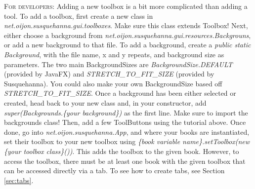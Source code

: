 \documentclass{report}
\begin{document}
	\par
	\begin{tcolorbox}[width=1\textwidth]
		\textsc{For developers:} Adding a new toolbox is a bit more complicated than adding a tool. To add a toolbox, first create a new class in \emph{net.oijon.susquehanna.gui.toolboxes}. Make sure this class extends Toolbox! Next, either choose a background from \emph{net.oijon.susquehanna.gui.resources.Backgrouns}, or add a new background to that file. To add a background, create a \emph{public static Background}, with the file name, x and y repeats, and background size as parameters. The two main BackgroundSizes are \emph{BackgroundSize.DEFAULT} (provided by JavaFX) and \emph{STRETCH\_TO\_FIT\_SIZE} (provided by Susquehanna). You could also make your own BackgroundSize based off \emph{STRETCH\_TO\_FIT\_SIZE}. Once a background has been either selected or created, head back to your new class and, in your constructor, add \emph{super(Backgrounds.\{your background\})} as the first line. Make sure to import the backgrounds class! Then, add a few ToolButtons using the tutorial above. Once done, go into \emph{net.oijon.susquehanna.App}, and where your books are instantiated, set their toolbox to your new toolbox using \emph{\{book variable name\}.setToolbox(new \{your toolbox class\}())}. This adds the toolbox to the given book. However, to access the toolbox, there must be at least one book with the given toolbox that can be accessed directly via a tab. To see how to create tabs, see Section \ref{sec:tabs}.
	\end{tcolorbox}
\end{document}
